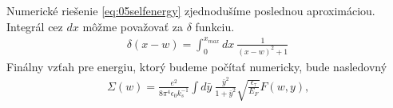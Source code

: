 Numerické riešenie \eqref{eq:05selfenergy} zjednodušíme poslednou aproximáciou. Integrál cez $dx$ môžme považovať za $\delta$ funkciu.
\begin{align}
\delta(x-w)=\int_0^{x_{max}}dx\ \frac{1}{(x-w)^2+1}
\end{align}
Finálny vzťah pre energiu, ktorý budeme počítať numericky, bude nasledovný
\begin{align}
\label{eq:05selfenergy2}
\Sigma(w)=\frac{e^2}{8\pi^4\epsilon_0 k_s^{-1}} \int d\bar{y}\ \frac{\bar{y}^2}{1+\bar{y}^2}\sqrt{\frac{\epsilon_\tau}{E_F}}F(w,y) \text{,}
\end{align} 
